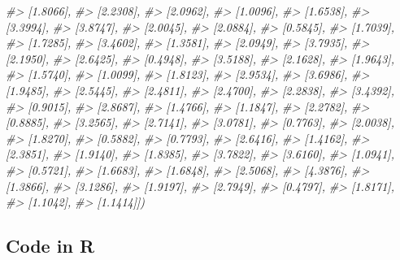 \documentclass[]{book}
\newenvironment{Shaded}{\begin{snugshade}}{\end{snugshade}}
\newcommand{\CommentTok}[1]{\textcolor[rgb]{0.56,0.35,0.01}{\textit{#1}}}
\begin{document}
\begin{Shaded}
\begin{Highlighting}[]
\CommentTok{#>         [1.8066],}
\CommentTok{#>         [2.2308],}
\CommentTok{#>         [2.0962],}
\CommentTok{#>         [1.0096],}
\CommentTok{#>         [1.6538],}
\CommentTok{#>         [3.3994],}
\CommentTok{#>         [3.8747],}
\CommentTok{#>         [2.0045],}
\CommentTok{#>         [2.0884],}
\CommentTok{#>         [0.5845],}
\CommentTok{#>         [1.7039],}
\CommentTok{#>         [1.7285],}
\CommentTok{#>         [3.4602],}
\CommentTok{#>         [1.3581],}
\CommentTok{#>         [2.0949],}
\CommentTok{#>         [3.7935],}
\CommentTok{#>         [2.1950],}
\CommentTok{#>         [2.6425],}
\CommentTok{#>         [0.4948],}
\CommentTok{#>         [3.5188],}
\CommentTok{#>         [2.1628],}
\CommentTok{#>         [1.9643],}
\CommentTok{#>         [1.5740],}
\CommentTok{#>         [1.0099],}
\CommentTok{#>         [1.8123],}
\CommentTok{#>         [2.9534],}
\CommentTok{#>         [3.6986],}
\CommentTok{#>         [1.9485],}
\CommentTok{#>         [2.5445],}
\CommentTok{#>         [2.4811],}
\CommentTok{#>         [2.4700],}
\CommentTok{#>         [2.2838],}
\CommentTok{#>         [3.4392],}
\CommentTok{#>         [0.9015],}
\CommentTok{#>         [2.8687],}
\CommentTok{#>         [1.4766],}
\CommentTok{#>         [1.1847],}
\CommentTok{#>         [2.2782],}
\CommentTok{#>         [0.8885],}
\CommentTok{#>         [3.2565],}
\CommentTok{#>         [2.7141],}
\CommentTok{#>         [3.0781],}
\CommentTok{#>         [0.7763],}
\CommentTok{#>         [2.0038],}
\CommentTok{#>         [1.8270],}
\CommentTok{#>         [0.5882],}
\CommentTok{#>         [0.7793],}
\CommentTok{#>         [2.6416],}
\CommentTok{#>         [1.4162],}
\CommentTok{#>         [2.3851],}
\CommentTok{#>         [1.9140],}
\CommentTok{#>         [1.8385],}
\CommentTok{#>         [3.7822],}
\CommentTok{#>         [3.6160],}
\CommentTok{#>         [1.0941],}
\CommentTok{#>         [0.5721],}
\CommentTok{#>         [1.6683],}
\CommentTok{#>         [1.6848],}
\CommentTok{#>         [2.5068],}
\CommentTok{#>         [4.3876],}
\CommentTok{#>         [1.3866],}
\CommentTok{#>         [3.1286],}
\CommentTok{#>         [1.9197],}
\CommentTok{#>         [2.7949],}
\CommentTok{#>         [0.4797],}
\CommentTok{#>         [1.8171],}
\CommentTok{#>         [1.1042],}
\CommentTok{#>         [1.1414]])}
\end{Highlighting}
\end{Shaded}

\hypertarget{code-in-r-1}{%
\subsection{Code in R}\label{code-in-r-1}}
\end{document}
